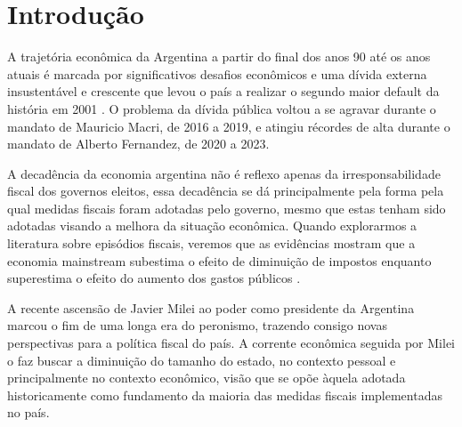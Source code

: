 \documentclass[a4paper, 12pt, openany, oneside, brazil]{abntex2}
\begin{document}

\textual
\pagestyle{tccinsper} %

\chapter{Introdução}

A trajetória econômica da Argentina a partir do final dos anos 90 até os anos atuais é marcada por significativos desafios econômicos e uma dívida externa insustentável e crescente que levou o país a realizar o segundo maior default da história em 2001 \cite{Damill2006}. O problema da dívida pública voltou a se agravar durante o mandato de Mauricio Macri, de 2016 a 2019, e atingiu récordes de alta durante o mandato de Alberto Fernandez, de 2020 a 2023.

A decadência da economia argentina não é reflexo apenas da irresponsabilidade fiscal dos governos eleitos, essa decadência se dá principalmente pela forma pela qual medidas fiscais foram adotadas pelo governo, mesmo que estas tenham sido adotadas visando a melhora da situação econômica. Quando explorarmos a literatura sobre episódios fiscais, veremos que as evidências mostram que a economia mainstream subestima o efeito de diminuição de impostos enquanto superestima o efeito do aumento dos gastos públicos \cite{Alesina1998} \cite{Ribas2021} \cite{McDermott1996}.

A recente ascensão de Javier Milei ao poder como presidente da Argentina marcou o fim de uma longa era do peronismo, trazendo consigo novas perspectivas para a política fiscal do país. A corrente econômica seguida por Milei o faz buscar a diminuição do tamanho do estado, no contexto pessoal e principalmente no contexto econômico, visão que se opõe àquela adotada historicamente como fundamento da maioria das medidas fiscais implementadas no país.
\end{document}
